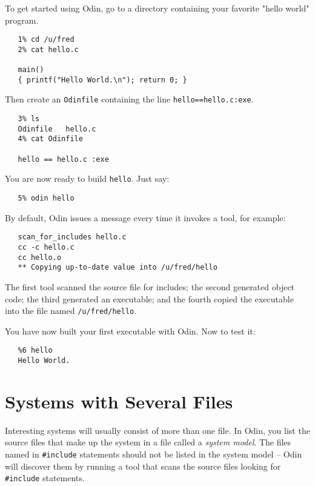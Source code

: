 \documentclass[hidelinks]{report}
\newcommand{\ex}{\tt}   %
\begin{document}
To get started using Odin,
go to a directory containing your favorite "hello world" program.
\begin{verbatim}
   1% cd /u/fred
   2% cat hello.c

   main()
   { printf("Hello World.\n"); return 0; }
\end{verbatim}
Then create an {\ex Odinfile} containing the line {\ex hello==hello.c:exe}.
\begin{verbatim}
   3% ls
   Odinfile   hello.c
   4% cat Odinfile

   hello == hello.c :exe
\end{verbatim}
You are now ready to build {\ex hello}.  Just say:
\begin{verbatim}
   5% odin hello
\end{verbatim}
By default, Odin issues a message every time it invokes a tool, for example:
\begin{verbatim}
   scan_for_includes hello.c
   cc -c hello.c
   cc hello.o
   ** Copying up-to-date value into /u/fred/hello
\end{verbatim}
The first tool scanned the source file for includes; the second generated
object code; the third generated an executable; and the fourth copied the
executable into the file named {\ex /u/fred/hello}.

You have now built your first executable with Odin.  Now to test it:
\begin{verbatim}
   %6 hello
   Hello World.
\end{verbatim}


\section{Systems with Several Files}

Interesting systems will usually consist of more than one file.
In Odin, you list the source files that make up the system in a
file called a {\em system model}.
The files named in {\ex \#include} statements
should not be listed in the system model --
Odin will discover them by running a tool
that scans the source files looking for {\ex \#include} statements.
\end{document}
